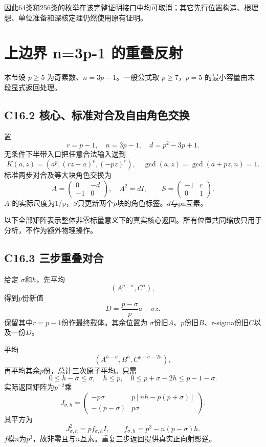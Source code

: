 {因此64类和256类的枚举在该完整证明接口中均可取消；其它先行位置构造、根理想、单位准备和深核定理仍然使用原有证明。}


\section{上边界 n=3p-1 的重叠反射}\label{construct:r-last}
{本节设} \(p\ge5\) {为奇素数、}\(n=3p-1\){。一般公式取} \(p\ge7\){，}\(p=5\) {的最小容量由末段显式返回处理。}

\subsection*{\texorpdfstring{{C16.2} {核心、标准对合及自由角色交换}}{C16.2 核心、标准对合及自由角色交换}}\label{C16-h114}

{置} \[
r=p-1,\quad n=3p-1,\quad d=p^2-3p+1.
\] {无条件下半带入口把任意合法输入送到} \[
K(a,z)=(a^p,(rz-a)^p,(-pz)^r),
\quad \gcd(a,z)=\gcd(a+pz,n)=1.
\tag{C16.2.1}
\] {标准两步对合及等大块角色交换为} \[
A=\begin{pmatrix}0&-d\\-1&0\end{pmatrix},
\quad A^2=dI,\qquad
S=\begin{pmatrix}-1&r\\0&1\end{pmatrix}.
\tag{C16.2.2}
\] {\ensuremath{A}} {的实际尺度为1/p，\ensuremath{S}只更新两个\ensuremath{p}块的角色标签。\ensuremath{d}与pn互素。}

{以下全部矩阵表示整体非零标量意义下的真实核心返回。所有位置共同缩放只用于分析，不作为额外物理操作。}

\subsection*{\texorpdfstring{{C16.3} {三步重叠对合}}{C16.3 三步重叠对合}}\label{C16-h115}

{给定} {\ensuremath{\sigma }和\ensuremath{h}，先平均} \[
(A^{p-\sigma},C^\sigma),
\] {得到\ensuremath{p}份新值} \[
D=\frac{p-\sigma}{p}a-\sigma z.
\] {保留其中\ensuremath{r=p-1}份作最终载体。其余位置为} {\ensuremath{\sigma }份旧\ensuremath{A}、\ensuremath{p}份旧\ensuremath{B}、r-sigma份旧\ensuremath{C}以及一份\ensuremath{D}。}

{平均} \[
(A^{h-\sigma},B^h,C^{p+\sigma-2h}),
\] {再平均其余\ensuremath{p}份，总计三次原子平均。只需} \[
0\le h-\sigma\le\sigma,\quad h\le p,\quad
0\le p+\sigma-2h\le p-1-\sigma.
\tag{C16.3.1}
\] {实际返回矩阵为\ensuremath{p^{-2}}乘} \[
J_{\sigma,h}=
\begin{pmatrix}
-p\sigma&p[nh-p(p+\sigma)]\\
-(p-\sigma)&p\sigma
\end{pmatrix}.
\] {其平方为} \[
\boxed{J_{\sigma,h}^2=p f_{\sigma,h}I,\qquad
f_{\sigma,h}=p^3-n(p-\sigma)h.}
\tag{C16.3.2}
\] {\ensuremath{f}模\ensuremath{n}为\ensuremath{p^{3}}，故非零且与\ensuremath{n}互素。重复三步返回提供真实正向射影逆。}

